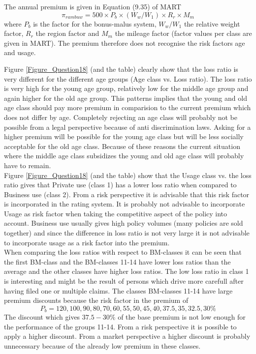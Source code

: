 \documentclass[11pt]{article}
\begin{document}
The annual premium is given in Equation (9.35) of MART
\begin{equation}
\pi_{rambuw} = 500 \times P_b \times (W_w / W_1) \times R_r \times M_m
\end{equation}
where $P_b$ is the factor for the bonus-malus system, $W_w / W_1$ the relative weight factor, $R_r$ the region factor and $M_m$ the mileage factor (factor values per class are given in MART). The premium therefore does not recognise the risk factors age and usage. 

Figure \ref{Figure_Question18} (and the table) clearly show that the loss ratio is very different for the different age groups (Age class vs. Loss ratio). The loss ratio is very high for the young age group, relatively low for the middle age group and again higher for the old age group. This patterns implies that the young and old age class should pay more premium in comparision to the current premium which does not differ by age. Completely rejecting an age class will probably not be possible from a legal perspective because of anti discrimination laws. Asking for a higher premium will be possible for the young age class but will be less socially acceptable for the old age class. Because of these reasons the current situation where the middle age class subsidizes the young and old age class will probably have to remain. \\

Figure \ref{Figure_Question18} (and the table) show that the Usage class vs. the loss ratio gives that Private use (class 1) has a lower loss ratio when compared to Business use (class 2). From a risk perspective it is advisable that this risk factor is incorporated in the rating system. It is probably not advisable to incorporate Usage as risk factor when taking the competitive aspect of the policy into account. Business use usually gives high policy volumes (many policies are sold together) and since the difference in loss ratio is not very large it is not advisable to incorporate usage as a risk factor into the premium. \\

When comparing the loss ratios with respect to BM-classes it can be seen that the first BM-class and the BM-classes 11-14 have lower loss ratios than the average and the other classes have higher loss ratios. The low loss ratio in class 1 is interesting and might be the result of persons which drive more carefull after having filed one or multiple claims. The classes BM-classes 11-14 have large premium discounts because the risk factor in the premium of
\begin{equation}
P_b = 120,100,90,80,70,60,55,50,45,40,37.5,35,32.5,30 \%
\end{equation} 
The discount which gives $37.5 - 30 \%$ of the base premium is not low enough for the performance of the groups 11-14. From a risk perspective it is possible to apply a higher discount. From a market perspective a higher discount is probably unnecessary because of the already low premium in these classes. \\
\end{document}

